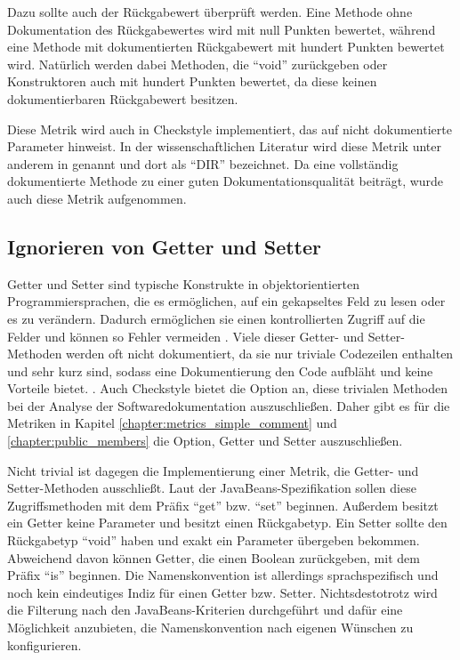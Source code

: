  Dazu sollte auch der Rückgabewert überprüft werden. Eine Methode ohne Dokumentation des Rückgabewertes wird mit null Punkten bewertet, während eine Methode mit dokumentierten Rückgabewert mit hundert Punkten bewertet wird. Natürlich werden dabei Methoden, die \enquote{void} zurückgeben oder Konstruktoren auch mit hundert Punkten bewertet, da diese keinen dokumentierbaren Rückgabewert besitzen. 
 
 Diese Metrik wird auch in Checkstyle implementiert, das auf nicht dokumentierte Parameter hinweist. In der wissenschaftlichen Literatur wird diese Metrik unter anderem in \cite[S. 5]{HowDocumentationEvolvesoverTime} genannt und dort als \enquote{DIR} bezeichnet. Da eine vollständig dokumentierte Methode zu einer guten Dokumentationsqualität beiträgt, wurde auch diese Metrik aufgenommen.

\subsection{Ignorieren von Getter und Setter }
Getter und Setter sind typische Konstrukte in objektorientierten Programmiersprachen, die es ermöglichen, auf ein gekapseltes Feld zu lesen oder es zu verändern. Dadurch ermöglichen sie einen kontrollierten Zugriff auf die Felder und können so Fehler vermeiden \cite[S. 235]{OntheUseofPropertiesinJavaApplications}. Viele dieser Getter- und Setter-Methoden werden oft nicht dokumentiert, da sie nur triviale Codezeilen enthalten und sehr kurz sind, sodass eine Dokumentierung den Code aufbläht und keine Vorteile bietet. \cite[S. 254]{JavadocViolationsandTheirEvolutioninOpen-SourceSoftware}. Auch Checkstyle bietet die Option an, diese trivialen Methoden bei der Analyse der Softwaredokumentation auszuschließen. Daher gibt es für die Metriken in Kapitel \ref{chapter:metrics_simple_comment} und \ref{chapter:public_members} die Option, Getter und Setter auszuschließen.

Nicht trivial ist dagegen die Implementierung einer Metrik, die Getter- und Setter-Methoden ausschließt. Laut der JavaBeans-Spezifikation \cite[S. 55]{javabeans} sollen diese Zugriffsmethoden mit dem Präfix \enquote{get} bzw. \enquote{set} beginnen. Außerdem besitzt ein Getter keine Parameter und besitzt einen Rückgabetyp. Ein Setter sollte den Rückgabetyp \enquote{void} haben und exakt ein Parameter übergeben bekommen. Abweichend davon können Getter, die einen Boolean zurückgeben, mit dem Präfix \enquote{is} beginnen. Die Namenskonvention ist allerdings sprachspezifisch und noch kein eindeutiges Indiz für einen Getter bzw. Setter. Nichtsdestotrotz wird die Filterung nach den JavaBeans-Kriterien durchgeführt und dafür eine Möglichkeit anzubieten, die Namenskonvention nach eigenen Wünschen zu konfigurieren. 

